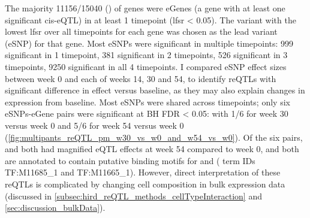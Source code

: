 

The majority 11156/15040 () of genes were eGenes (a gene with at least one significant cis-eQTL) in at least 1 timepoint (\gls{lfsr} < 0.05).
The variant with the lowest lfsr over all timepoints for each gene was 
chosen as the lead variant (eSNP) for that gene.
Most eSNPs were significant in multiple timepoints: 999 significant in 1 timepoint, 381 significant in 2 timepoints, 526 significant in 3 timepoints, 9250 significant in all 4 timepoints.
I compared eSNP effect sizes between week 0 and each of weeks 14, 30 and 54,
to identify \glspl{reQTL} with significant difference in effect versus baseline,
as they may also explain changes in expression from baseline.
Most eSNPs were shared across timepoints;
only six eSNPs-eGene pairs were significant at BH FDR < 0.05:
with 1/6 for week 30 versus week 0 and 5/6 for week 54 versus week 0 (\cref{fig:multipants_reQTL_pm_w30_vs_w0_and_w54_vs_w0}).
Of the six pairs,  and  both had magnified \gls{eQTL} effects at week 54 compared to week 0,
and both are annotated to contain putative binding motifs for  and  ( term IDs TF:M11685\_1 and TF:M11665\_1).
However, direct interpretation of these reQTLs is complicated by changing cell composition in bulk expression data (discussed in \cref{subsec:hird_reQTL_methods_cellTypeInteraction} and \cref{sec:discussion_bulkData}).


